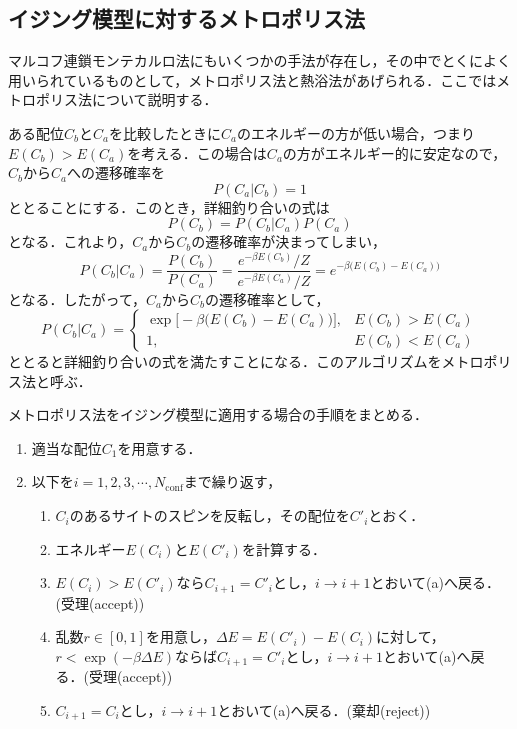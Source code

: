 \documentclass[a4paper,11pt]{jsreport}
\begin{document}
\subsection{イジング模型に対するメトロポリス法}
マルコフ連鎖モンテカルロ法にもいくつかの手法が存在し，その中でとくによく用いられているものとして，メトロポリス法と熱浴法があげられる．ここではメトロポリス法について説明する．\par
ある配位$C_b$と$C_a$を比較したときに$C_a$のエネルギーの方が低い場合，つまり$E(C_b)>E(C_a)$を考える．この場合は$C_a$の方がエネルギー的に安定なので，$C_b$から$C_a$への遷移確率を
\begin{equation}
  P(C_a|C_b) = 1
\end{equation}
ととることにする．このとき，詳細釣り合いの式は
\begin{equation}
  P(C_b) = P(C_b|C_a)P(C_a)
\end{equation}
となる．これより，$C_a$から$C_b$の遷移確率が決まってしまい，
\begin{equation}
  P(C_b|C_a) = \frac{P(C_b)}{P(C_a)} = \frac{e^{-\beta E(C_b)}/Z}{e^{-\beta E(C_a)}/Z} = e^{ -\beta\Big( E(C_b)-E(C_a) \Big)}
\end{equation}
となる．したがって，$C_a$から$C_b$の遷移確率として，
\begin{equation}
  P(C_b|C_a)=
  \begin{cases}
    \exp\Big[ -\beta\Big( E(C_b)-E(C_a) \Big) \Big], & E(C_b)>E(C_a) \\
    1,                                               & E(C_b)<E(C_a)
  \end{cases}
\end{equation}
ととると詳細釣り合いの式を満たすことになる．このアルゴリズムをメトロポリス法と呼ぶ．\par
メトロポリス法をイジング模型に適用する場合の手順をまとめる．
\begin{enumerate}
  \item 適当な配位$C_1$を用意する．
  \item 以下を$i = 1,2,3,\cdots,N_{\text{conf}}$まで繰り返す，
        \begin{enumerate}
          \item $C_i$のあるサイトのスピンを反転し，その配位を$C'_i$とおく．
          \item エネルギー$E(C_i)$と$E(C'_i)$を計算する．
          \item $E(C_i)>E(C'_i)$なら$C_{i+1}=C'_i$とし，$i \rightarrow i+1$とおいて(a)へ戻る．(受理(accept))
          \item 乱数$r \in [0,1]$を用意し，$\Delta E = E(C'_i)-E(C_i)$に対して，$r < \exp(-\beta\Delta E)$ならば$C_{i+1}=C'_i$とし，$i \rightarrow i+1$とおいて(a)へ戻る．(受理(accept))
          \item $C_{i+1}=C_i$とし，$i \rightarrow i+1$とおいて(a)へ戻る．(棄却(reject))
        \end{enumerate}
\end{enumerate}
\end{document}
